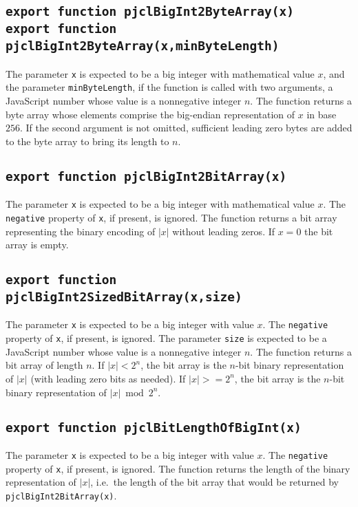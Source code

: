 \documentclass[12pt]{article}
\begin{document}
\subsection{\tt export function pjclBigInt2ByteArray(x)\\export function pjclBigInt2ByteArray(x,minByteLength)}

The parameter {\tt x} is expected to be a big integer with mathematical value $x$,
and the parameter {\tt minByteLength}, if the function is called with two
arguments, a JavaScript number whose value is a nonnegative integer $n$.
The function returns a byte array whose elements comprise the big-endian 
representation of $x$ in base $256$.  If the second argument is not omitted,
sufficient leading zero bytes are added to the byte array to bring its length
to $n$.

\subsection{\tt export function pjclBigInt2BitArray(x)}

The parameter {\tt x} is expected to be a big integer with mathematical value $x$.
The {\tt negative} property of {\tt x}, if present, is ignored.
The function returns a bit array representing the binary encoding of
$|x|$ without leading zeros.
If $x = 0$ the bit array is empty.

\subsection{\tt export function pjclBigInt2SizedBitArray(x,size)}

The parameter {\tt x} is expected to be a big integer with
value $x$.
The {\tt negative} property of {\tt x}, if present, is ignored.
The parameter {\tt size} is expected to be a JavaScript number whose
value is a nonnegative integer $n$.  The function returns a bit array
of length $n$.  If $|x| < 2^n$, the
bit array is the $n$-bit binary representation of $|x|$ (with leading zero bits as needed).  If $|x| >= 2^n$,
the bit array is the $n$-bit binary representation of $|x| \bmod 2^n$.

\subsection{\tt export function pjclBitLengthOfBigInt(x)}

The parameter {\tt x} is expected to be a big integer with
value $x$.  
The {\tt negative} property of {\tt x}, if present, is ignored.
The function returns the length of the binary
representation of $|x|$, i.e.\ the length of the bit array that would be
returned by {\tt pjclBigInt2BitArray(x)}.
\end{document}
